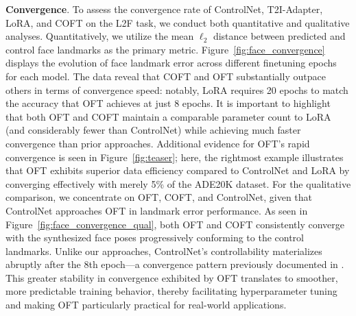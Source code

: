 {\textbf{Convergence}. To assess the convergence rate of ControlNet, T2I-Adapter, LoRA, and COFT on the L2F task, we conduct both quantitative and qualitative analyses. Quantitatively, we utilize the mean $\ell_2$ distance between predicted and control face landmarks as the primary metric. Figure~\ref{fig:face_convergence} displays the evolution of face landmark error across different finetuning epochs for each model. The data reveal that COFT and OFT substantially outpace others in terms of convergence speed: notably, LoRA requires 20 epochs to match the accuracy that OFT achieves at just 8 epochs. It is important to highlight that both OFT and COFT maintain a comparable parameter count to LoRA (and considerably fewer than ControlNet) while achieving much faster convergence than prior approaches. Additional evidence for OFT’s rapid convergence is seen in Figure~\ref{fig:teaser}; here, the rightmost example illustrates that OFT exhibits superior data efficiency compared to ControlNet and LoRA by converging effectively with merely 5\% of the ADE20K dataset. For the qualitative comparison, we concentrate on OFT, COFT, and ControlNet, given that ControlNet approaches OFT in landmark error performance. As seen in Figure~\ref{fig:face_convergence_qual}, both OFT and COFT consistently converge with the synthesized face poses progressively conforming to the control landmarks. Unlike our approaches, ControlNet’s controllability materializes abruptly after the 8th epoch—a convergence pattern previously documented in \cite{zhang2023adding}. This greater stability in convergence exhibited by OFT translates to smoother, more predictable training behavior, thereby facilitating hyperparameter tuning and making OFT particularly practical for real-world applications.

}
